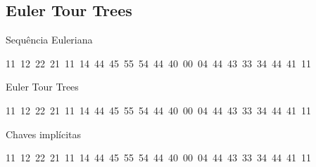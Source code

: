\documentclass{IFES-beamer}
\newcommand{\red}{\color{red}}
\begin{document}
\subsection{Euler Tour Trees}

\begin{frame}{Sequência Euleriana}
\begin{center}
\begin{figure}


\end{figure}
    {\large 11~12~22~21~11~{\red 14}~44~45~55~54~44~40~00~04~44~43~33~34~44~{\red 41~11}}
\end{center}
\end{frame}

\begin{frame}{Euler Tour Trees}
\begin{figure}[htb]
\centering
\scalebox{.7}{
}
\end{figure}
\begin{center}
{\large 11~12~22~21~11~14~44~45~55~54~44~40~00~04~44~43~33~34~44~41~11}

\end{center}
\end{frame}



\begin{frame}{Chaves implícitas}
\begin{figure}[htb]
\scalebox{.7}{
\centering
}
\end{figure}
\begin{center}
{\large 11~12~22~21~11~14~44~45~55~54~44~40~00~04~44~43~33~34~44~41~11}
\end{center}
\end{frame}
\end{document}

